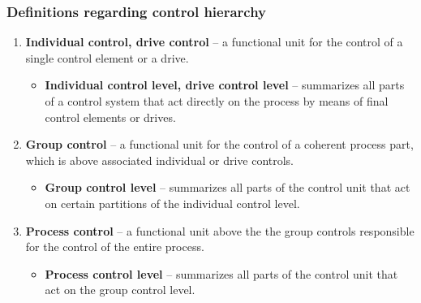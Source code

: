 \begin{frame}
	\frametitle{Definitions regarding control hierarchy}
	\begin{enumerate}
		\item \textbf{Individual control, drive control} – a functional unit for the control of a 
		single control element or a drive.
		\begin{itemize}
			\item \textbf{Individual control level, drive control level} – summarizes all parts 
			of a control system that act directly on the process 
			by means of final control elements or drives.
		\end{itemize}
		\item \textbf{Group control} – a functional unit for the control of a 
		coherent process part, which is above associated individual or drive controls.
		\begin{itemize}
			\item \textbf{Group control level} – summarizes all parts of 
			the control unit that act on certain partitions of the individual control level.  
		\end{itemize}
		\item \textbf{Process control} – a functional unit above the 
		the group controls responsible for the control of the entire process.
		\begin{itemize}
			\item \textbf{Process control level} – summarizes all parts of 
			the control unit that act on the group control level.
		\end{itemize}
	\end{enumerate}
\end{frame}

